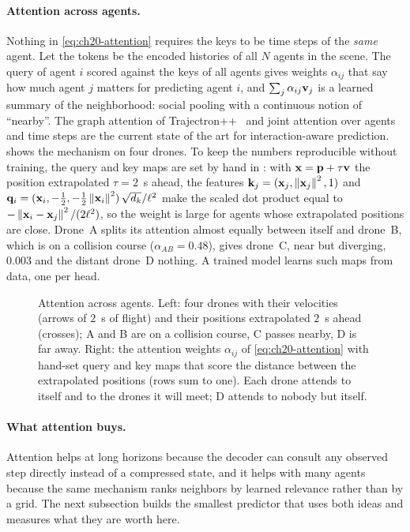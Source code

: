\paragraph{Attention across agents.}
Nothing in \cref{eq:ch20-attention} requires the keys to be time steps of the
\emph{same} agent. Let the tokens be the encoded histories of all $N$ agents
in the scene. The query of agent $i$ scored against the keys of all agents
gives weights $\alpha_{ij}$ that say how much agent $j$ matters for predicting
agent $i$, and $\sum_j \alpha_{ij}\mathbf{v}_j$ is a learned summary of the
neighborhood: social pooling with a continuous notion of ``nearby''. The
graph attention of Trajectron++~\cite{salzmann2020trajectron} and joint
attention over agents and time steps are the current state of the art for
interaction-aware prediction.  shows the mechanism on
four drones. To keep the numbers reproducible without training, the query and
key maps are set by hand in : with
$\mathbf{x} = \mathbf{p} + \tau\mathbf{v}$ the position extrapolated $\tau = 2$~s ahead, the
features $\mathbf{k}_j = (\mathbf{x}_j, \left\lVert \mathbf{x}_j \right\rVert^2, 1)$ and
$\mathbf{q}_i = (\mathbf{x}_i, -\tfrac12, -\tfrac12\left\lVert \mathbf{x}_i \right\rVert^2)\,\sqrt{d_k}/\ell^2$
make the scaled dot product equal to
$-\left\lVert \mathbf{x}_i - \mathbf{x}_j \right\rVert^2 / (2\ell^2)$, so the weight is large for
agents whose extrapolated positions are close. Drone~A splits its attention
almost equally between itself and drone~B, which is on a collision course
($\alpha_{AB} = 0.48$), gives drone~C, near but diverging, $0.003$ and the
distant drone~D nothing. A trained model learns such maps from data, one per
head.

\begin{figure}[tb]
  \centering
  \caption{Attention across agents. Left: four drones with their velocities
  (arrows of $2$~s of flight) and their positions extrapolated $2$~s ahead
  (crosses); A and B are on a collision course, C passes nearby, D is far
  away. Right: the attention weights $\alpha_{ij}$ of \cref{eq:ch20-attention}
  with hand-set query and key maps that score the distance between the
  extrapolated positions (rows sum to one). Each drone attends to itself and
  to the drones it will meet; D attends to nobody but itself.}
  \label{fig:ch20-attention}
\end{figure}

\paragraph{What attention buys.}
Attention helps at long horizons because the decoder can consult any observed
step directly instead of a compressed state, and it helps with many agents
because the same mechanism ranks neighbors by learned relevance rather than
by a grid. The next subsection builds the smallest predictor that uses both
ideas and measures what they are worth here.


